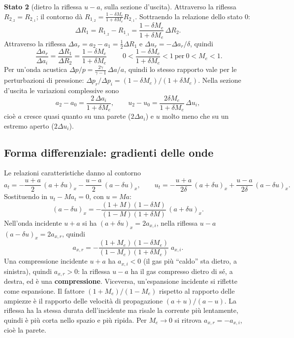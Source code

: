 \documentclass[11pt,a4paper]{article}
\newcommand{\uma}{u-a}
\newcommand{\upa}{u+a}
\newcommand{\Ru}{R_1}
\newcommand{\Rd}{R_2}
\newcommand{\Me}{M_e}
\begin{document}
\textbf{Stato 2} (dietro la riflessa $\uma$, sulla sezione d'uscita). Attraverso la riflessa
$\Rd_{,2}=\Rd_{,1}$; il contorno dà $\Ru_{,2}=\frac{1-\delta\Me}{1+\delta\Me}\Rd_{,1}$. Sottraendo la
relazione dello stato 0:
\[
  \Delta\Ru=\Ru_{,2}-\Ru_{,1}=\frac{1-\delta\Me}{1+\delta\Me}\,\Delta\Rd .
\]
Attraverso la riflessa $\Delta a_r=a_2-a_1=\tfrac12\Delta\Ru$ e $\Delta u_r=-\Delta a_r/\delta$, quindi
\[
  \boxed{\;\frac{\Delta a_r}{\Delta a_i}=\frac{\Delta\Ru}{\Delta\Rd}=\frac{1-\delta\Me}{1+\delta\Me}\;}
  \qquad 0<\frac{1-\delta\Me}{1+\delta\Me}<1 \ \text{per}\ 0<\Me<1 .
\]
Per un'onda acustica $\Delta p/p=\frac{2\gamma}{\gamma-1}\,\Delta a/a$, quindi lo stesso rapporto vale per le
perturbazioni di pressione: $\Delta p_r/\Delta p_i=(1-\delta\Me)/(1+\delta\Me)$.
Nella sezione d'uscita le variazioni complessive sono
\[
  a_2-a_0=\frac{2\,\Delta a_i}{1+\delta\Me},\qquad
  u_2-u_0=\frac{2\delta\Me}{1+\delta\Me}\,\Delta u_i ,
\]
cioè $a$ cresce quasi quanto su una parete ($2\Delta a_i$) e $u$ molto meno che su un estremo aperto
($2\Delta u_i$).

\subsection{Forma differenziale: gradienti delle onde}\label{sec:diff}
Le relazioni caratteristiche danno al contorno
\[
  a_t=-\frac{u+a}{2}\,(a+\delta u)_x-\frac{u-a}{2}\,(a-\delta u)_x,\qquad
  u_t=-\frac{u+a}{2\delta}\,(a+\delta u)_x+\frac{u-a}{2\delta}\,(a-\delta u)_x .
\]
Sostituendo in $u_t-Ma_t=0$, con $u=Ma$:
\[
  (a-\delta u)_x=-\frac{(1+M)(1-\delta M)}{(1-M)(1+\delta M)}\,(a+\delta u)_x .
\]
Nell'onda incidente $\upa$ si ha $(a+\delta u)_x=2a_{x,i}$, nella riflessa $\uma$ $(a-\delta u)_x=2a_{x,r}$, quindi
\[
  a_{x,r}=-\frac{(1+\Me)(1-\delta\Me)}{(1-\Me)(1+\delta\Me)}\;a_{x,i}.
\]
Una compressione incidente $\upa$ ha $a_{x,i}<0$ (il gas più ``caldo'' sta dietro, a sinistra), quindi
$a_{x,r}>0$: la riflessa $\uma$ ha il gas compresso dietro di sé, a destra, ed è una \textbf{compressione}.
Viceversa, un'espansione incidente si riflette come espansione. Il fattore $(1+\Me)/(1-\Me)$ rispetto al rapporto
delle ampiezze è il rapporto delle velocità di propagazione $(a+u)/(a-u)$. La riflessa ha la stessa durata
dell'incidente ma risale la corrente più lentamente, quindi è più corta nello spazio e più ripida. Per
$\Me\to0$ si ritrova $a_{x,r}=-a_{x,i}$, cioè la parete.
\end{document}
